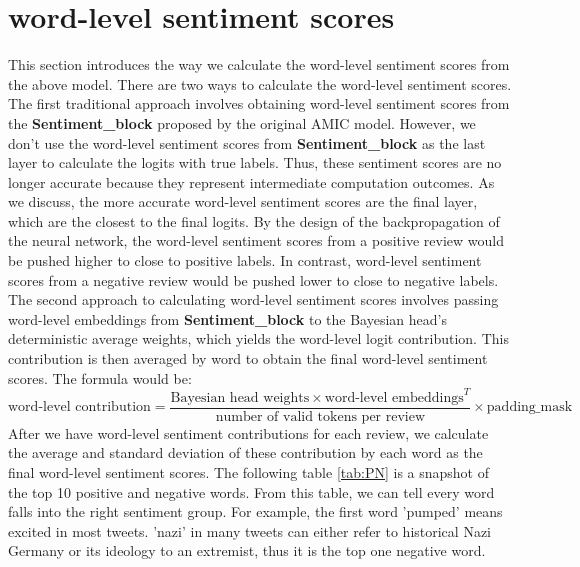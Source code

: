 \documentclass{article}
\begin{document}
\section{word-level sentiment scores}
This section introduces the way we calculate the word-level sentiment scores from the above model. There are two ways to calculate the word-level sentiment scores. The first traditional approach involves obtaining word-level sentiment scores from the \textbf{Sentiment\_block} proposed by the original AMIC model. However, we don't use the word-level sentiment scores from \textbf{Sentiment\_block} as the last layer to calculate the logits with true labels. Thus, these sentiment scores are no longer accurate because they represent intermediate computation outcomes. As we discuss, the more accurate word-level sentiment scores are the final layer, which are the closest to the final logits. By the design of the backpropagation of the neural network, the word-level sentiment scores from a positive review would be pushed higher to close to positive labels. In contrast, word-level sentiment scores from a negative review would be pushed lower to close to negative labels. The second approach to calculating word-level sentiment scores involves passing word-level embeddings from \textbf{Sentiment\_block} to the Bayesian head's deterministic average weights, which yields the word-level logit contribution. This contribution is then averaged by word to obtain the final word-level sentiment scores. The formula would be: $$\text{word-level contribution}=\frac{\text{Bayesian head weights} \times \text{word-level embeddings}^T}{\text{number of valid tokens per review}}\times \text{padding\_mask}$$ After we have word-level sentiment contributions for each review, we calculate the average and standard deviation of these contribution by each word as the final word-level sentiment scores. The following table \ref{tab:PN} is a snapshot of the top 10 positive and negative words. From this table, we can tell every word falls into the right sentiment group. For example, the first word 'pumped' means excited in most tweets. 'nazi' in many tweets can either refer to historical Nazi Germany or its ideology to an extremist, thus it is the top one negative word. 
\end{document}
